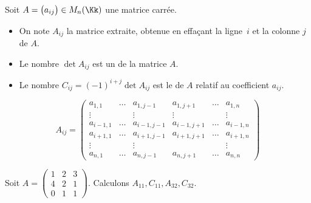 \documentclass[class=report,crop=false]{standalone}
\begin{document}
\begin{definition}
Soit $A = \big( a_{ij}\big) \in M_n(\Kk)$ une matrice carrée.

\begin{itemize}
  \item On note $A_{ij}$ la matrice extraite, obtenue en effaçant la ligne~$i$ et la colonne $j$ de $A$.
  \item Le nombre $\det A_{ij}$ est un  de la matrice $A$.
  \item Le nombre $C_{ij} = (-1)^{i+j}\det A_{ij}$ est le  de $A$
  relatif au coefficient $a_{ij}$.
\end{itemize}
\end{definition}

\[
A_{ij} = \begin{pmatrix}
a_{1,1} & \dots & a_{1,j-1} & a_{1,j+1} &\dots & a_{1,n}\\
\vdots &&\vdots &\vdots &&\vdots \\
a_{i-1,1} & \dots & a_{i-1,j-1} & a_{i-1,j+1} &\dots & a_{i-1,n}\\
a_{i+1,1} & \dots & a_{i+1,j-1} & a_{i+1,j+1} &\dots & a_{i+1,n}\\
\vdots &&\vdots &&&\vdots \\
a_{n,1} & \dots & a_{n,j-1} & a_{n,j+1}& \dots & a_{n,n}
\end{pmatrix}
\]


\begin{exemple}
Soit $ A =
\begin{pmatrix}
1 & 2 & 3\\
4 & 2 & 1\\
0 & 1 & 1
\end{pmatrix}$.
Calculons $A_{11}, C_{11}, A_{32}, C_{32}$.



%
%
%
\end{exemple}
\end{document}
